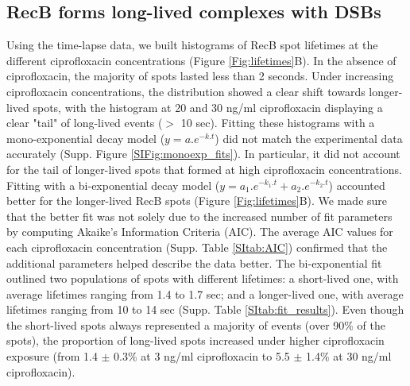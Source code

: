 \subsection*{RecB forms long-lived complexes with DSBs}
Using the time-lapse data, we built histograms of RecB spot lifetimes at the different ciprofloxacin concentrations (Figure \ref{Fig:lifetimes}B). In the absence of ciprofloxacin, the majority of spots lasted less than 2 seconds. Under increasing ciprofloxacin concentrations, the distribution showed a clear shift towards longer-lived spots, with the histogram at 20 and 30 ng/ml ciprofloxacin displaying a clear "tail" of long-lived events ($>$ 10 sec). Fitting these histograms with a mono-exponential decay model ($y = a.e^{-k.t}$) did not match the experimental data accurately (Supp. Figure \ref{SIFig:monoexp_fits}). In particular, it did not account for the tail of longer-lived spots that formed at high ciprofloxacin concentrations. Fitting with a bi-exponential decay model ($y = a_1.e^{-k_1.t} + a_2.e^{-k_2.t}$) accounted better for the longer-lived RecB spots (Figure \ref{Fig:lifetimes}B). We made sure that the better fit was not solely due to the increased number of fit parameters by computing Akaike's Information Criteria (AIC). The average AIC values for each ciprofloxacin concentration (Supp. Table \ref{SItab:AIC}) confirmed that the additional parameters helped describe the data better. The bi-exponential fit outlined two populations of spots with different lifetimes: a short-lived one, with average lifetimes ranging from 1.4 to 1.7 sec; and a longer-lived one, with average lifetimes ranging from 10 to 14 sec (Supp. Table \ref{SItab:fit_results}). Even though the short-lived spots always represented a majority of events (over 90\% of the spots), the proportion of long-lived spots increased under higher ciprofloxacin exposure (from 1.4 $\pm$ 0.3\% at 3 ng/ml ciprofloxacin to 5.5 $\pm$ 1.4\% at 30 ng/ml ciprofloxacin).

